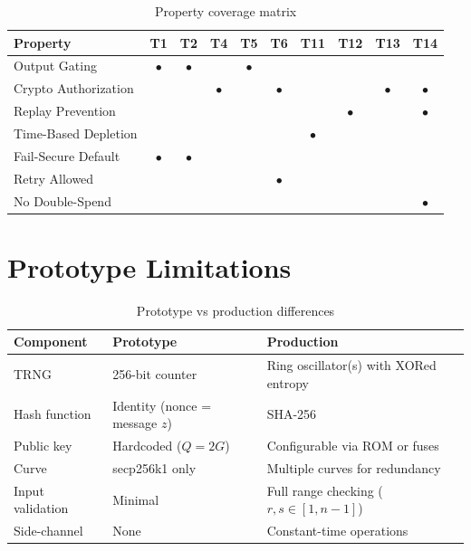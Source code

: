 \documentclass[11pt]{article}
\begin{document}
\begin{table}[h]
\centering
\begin{tabular}{@{}lccccccccc@{}}
\toprule
\textbf{Property} & \textbf{T1} & \textbf{T2} & \textbf{T4} & \textbf{T5} & \textbf{T6} & \textbf{T11} & \textbf{T12} & \textbf{T13} & \textbf{T14} \\
\midrule
Output Gating & $\bullet$ & $\bullet$ & & $\bullet$ & & & & & \\
\midrule
Crypto Authorization & & & $\bullet$ & & $\bullet$ & & & $\bullet$ & $\bullet$ \\
\midrule
Replay Prevention & & & & & & & $\bullet$ & & $\bullet$ \\
\midrule
Time-Based Depletion & & & & & & $\bullet$ & & & \\
\midrule
Fail-Secure Default & $\bullet$ & $\bullet$ & & & & & & & \\
\midrule
Retry Allowed & & & & & $\bullet$ & & & & \\
\midrule
No Double-Spend & & & & & & & & & $\bullet$ \\
\bottomrule
\end{tabular}
\caption{Property coverage matrix}
\end{table}

\section{Prototype Limitations}

\begin{table}[h]
\centering
\begin{tabular}{@{}lll@{}}
\toprule
\textbf{Component} & \textbf{Prototype} & \textbf{Production} \\
\midrule
TRNG & 256-bit counter & Ring oscillator(s) with XORed entropy \\
\midrule
Hash function & Identity (nonce = message $z$) & SHA-256 \\
\midrule
Public key & Hardcoded ($Q = 2G$) & Configurable via ROM or fuses \\
\midrule
Curve & secp256k1 only & Multiple curves for redundancy \\
\midrule
Input validation & Minimal & Full range checking ($r, s \in [1, n-1]$) \\
\midrule
Side-channel & None & Constant-time operations \\
\bottomrule
\end{tabular}
\caption{Prototype vs production differences}
\end{table}
\end{document}
